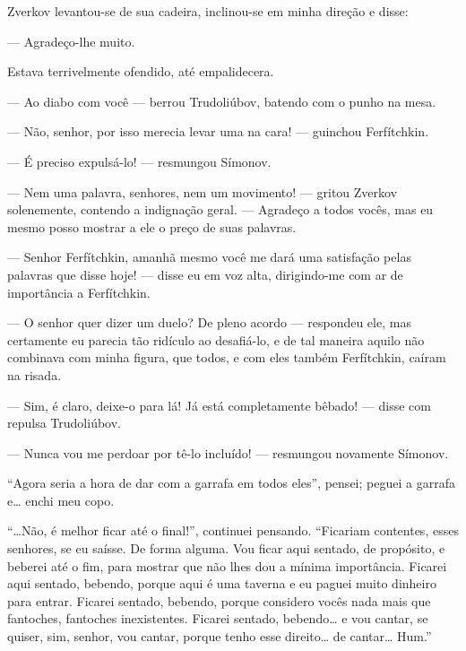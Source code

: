 Zverkov levantou-se de sua cadeira, inclinou-se em minha direção e
disse:

--- Agradeço-lhe muito.

Estava terrivelmente ofendido, até empalidecera.

--- Ao diabo com você --- berrou Trudoliúbov, batendo com o punho na mesa.

--- Não, senhor, por isso merecia levar uma na cara! --- guinchou
Ferfítchkin.

--- É preciso expulsá-lo! --- resmungou Símonov.

--- Nem uma palavra, senhores, nem um movimento! --- gritou Zverkov
solenemente, contendo a indignação geral. --- Agradeço a todos vocês, mas
eu mesmo posso mostrar a ele o preço de suas palavras.

--- Senhor Ferfítchkin, amanhã mesmo você me dará uma satisfação pelas
palavras que disse hoje! --- disse eu em voz alta, dirigindo-me com ar de
importância a Ferfítchkin.

--- O senhor quer dizer um duelo? De pleno acordo --- respondeu ele, mas
certamente eu parecia tão ridículo ao desafiá-lo, e de tal maneira
aquilo não combinava com minha figura, que todos, e com eles também
Ferfítchkin, caíram na risada.

--- Sim, é claro, deixe-o para lá! Já está completamente bêbado! --- disse
com repulsa Trudoliúbov.

--- Nunca vou me perdoar por tê-lo incluído! --- resmungou novamente
Símonov.

“Agora seria a hora de dar com a garrafa em todos eles”, pensei; peguei
a garrafa e\ldots{} enchi meu copo.

“\ldots{}Não, é melhor ficar até o final!”, continuei pensando. “Ficariam
contentes, esses senhores, se eu saísse. De forma alguma. Vou ficar
aqui sentado, de propósito, e beberei até o fim, para mostrar que não
lhes dou a mínima importância. Ficarei aqui sentado, bebendo, porque
aqui é uma taverna e eu paguei muito dinheiro para entrar. Ficarei
sentado, bebendo, porque considero vocês nada mais que fantoches,
fantoches inexistentes. Ficarei sentado, bebendo\ldots{} e vou cantar, se
quiser, sim, senhor, vou cantar, porque tenho esse direito\ldots{} de
cantar\ldots{} Hum.”

